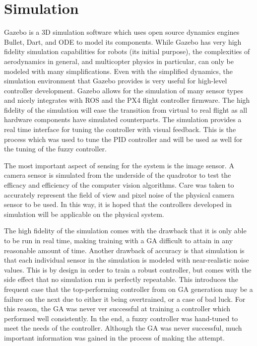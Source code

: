 \section{Simulation}
Gazebo is a 3D simulation software which uses open source dynamics engines Bullet, Dart, and ODE to model its
components. While Gazebo has very high fidelity simulation capabilities for robots (its initial purpose), the
complexities of aerodynamics in general, and multicopter physics in particular, can only be modeled with many
simplifications. Even with the simplified dynamics, the simulation environment that Gazebo provides is very
useful for high-level controller development. Gazebo allows for the simulation of many sensor types and nicely
integrates with ROS and the PX4 flight controller firmware. The high fidelity of the simulation will ease the
transition from virtual to real flight as all hardware components have simulated counterparts. The simulation
provides a real time interface for tuning the controller with visual feedback. This is the process which was
used to tune the PID controller and will be used as well for the tuning of the fuzzy controller.

The most important aspect of sensing for the system is the image sensor. A camera sensor is simulated from the
underside of the quadrotor to test the efficacy and efficiency of the computer vision algorithms. Care was
taken to accurately represent the field of view and pixel noise of the physical camera sensor to be used. In
this way, it is hoped that the controllers developed in simulation will be applicable on the physical system.

The high fidelity of the simulation comes with the drawback that it is only able to be run in real time,
making training with a GA difficult to attain in any reasonable amount of time. Another drawback of accuracy
is that simulation is that each individual sensor in the simulation is modeled with near-realistic noise
values. This is by design in order to train a robust controller, but comes with the side effect that no
simulation run is perfectly repeatable. This introduces the frequent case that the top-performing controller
from on GA generation may be a failure on the next due to either it being overtrained, or a case of bad luck.
For this reason, the GA was never ver successful at training a controller which performed well consistently.
In the end, a fuzzy controller was hand-tuned to meet the needs of the controller. Although the GA was never
successful, much important information was gained in the process of making the attempt.

